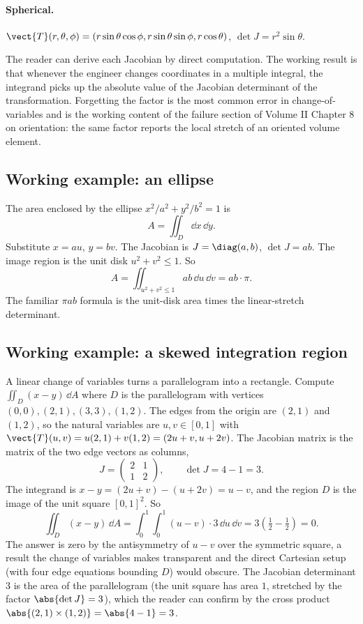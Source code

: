 \paragraph{Spherical.} $\vect{T}(r, \theta, \phi) =
(r\sin\theta\cos\phi, r\sin\theta\sin\phi, r\cos\theta)$,
$\det J = r^{2} \sin\theta$.

The reader can derive each Jacobian by direct computation. The
working result is that whenever the engineer changes coordinates in
a multiple integral, the integrand picks up the absolute value of
the Jacobian determinant of the transformation. Forgetting the
factor is the most common error in change-of-variables and is the
working content of the failure section of Volume II Chapter 8 on
orientation: the same factor reports the local stretch of an oriented
volume element.

\subsection{Working example: an ellipse}

The area enclosed by the ellipse $x^{2}/a^{2} + y^{2}/b^{2} = 1$ is
\[
A = \iint_{D} \dd x\,\dd y.
\]
Substitute $x = a u$, $y = b v$. The Jacobian is $J = \diag(a, b)$,
$\det J = a b$. The image region is the unit disk $u^{2} + v^{2} \leq
1$. So
\[
A = \iint_{u^{2} + v^{2} \leq 1} a b \,\dd u\,\dd v = a b \cdot \pi.
\]
The familiar $\pi a b$ formula is the unit-disk area times the
linear-stretch determinant.

\subsection{Working example: a skewed integration region}

A linear change of variables turns a parallelogram into a rectangle.
Compute $\iint_{D}(x - y)\,\dd A$ where $D$ is the parallelogram with
vertices $(0, 0), (2, 1), (3, 3), (1, 2)$. The edges from the origin
are $(2, 1)$ and $(1, 2)$, so the natural variables are $u, v \in
[0, 1]$ with $\vect{T}(u, v) = u(2, 1) + v(1, 2) = (2u + v, u + 2v)$.
The Jacobian matrix is the matrix of the two edge vectors as columns,
\[
J = \begin{pmatrix} 2 & 1 \\ 1 & 2 \end{pmatrix},
\qquad \det J = 4 - 1 = 3.
\]
The integrand is $x - y = (2u + v) - (u + 2v) = u - v$, and the
region $D$ is the image of the unit square $[0, 1]^{2}$. So
\[
\iint_{D}(x - y)\,\dd A = \int_{0}^{1}\!\int_{0}^{1}(u - v)\cdot 3
\,\dd u\,\dd v = 3\left(\tfrac{1}{2} - \tfrac{1}{2}\right) = 0.
\]
The answer is zero by the antisymmetry of $u - v$ over the symmetric
square, a result the change of variables makes transparent and the
direct Cartesian setup (with four edge equations bounding $D$) would
obscure. The Jacobian determinant $3$ is the area of the
parallelogram (the unit square has area $1$, stretched by the factor
$\abs{\det J} = 3$), which the reader can confirm by the cross
product $\abs{(2, 1) \times (1, 2)} = \abs{4 - 1} = 3$.

